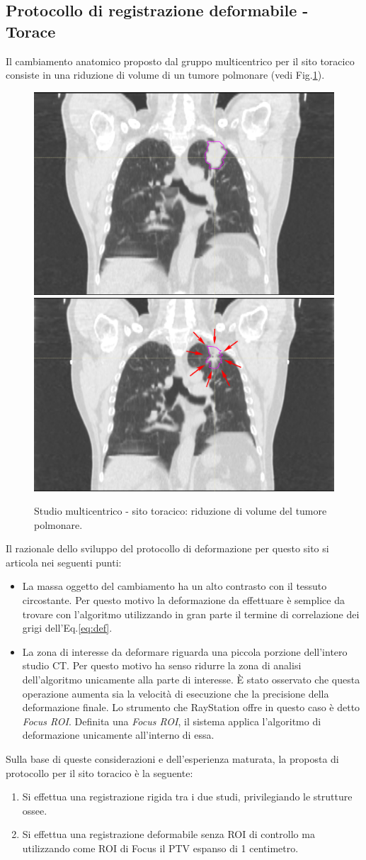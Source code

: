 \subsection{Protocollo di registrazione deformabile - Torace}
Il cambiamento anatomico proposto dal gruppo multicentrico per il sito toracico consiste in una riduzione di volume di un tumore polmonare (vedi Fig.\ref{fig:YES_thorax}). 
\begin{figure}
\centering
\includegraphics[width=.48\textwidth]{./cap3/YES_Thorax.png}
\includegraphics[width=.48\textwidth]{./cap3/YES_Thorax_shrink.png}
\caption{Studio multicentrico - sito toracico: riduzione di volume del tumore polmonare.}
\label{fig:YES_thorax}
\end{figure}
Il razionale dello sviluppo del protocollo di deformazione per questo sito si articola nei seguenti punti:
\begin{itemize}
\item La massa oggetto del cambiamento ha un alto contrasto con il tessuto circostante. Per questo motivo la deformazione da effettuare è semplice da trovare con l'algoritmo utilizzando in gran parte il termine di correlazione dei grigi dell'Eq.\eqref{eq:def}.
\item La zona di interesse da deformare riguarda una piccola porzione dell'intero studio CT. Per questo motivo ha senso ridurre la zona di analisi dell'algoritmo unicamente alla parte di interesse. \`E stato osservato che questa operazione aumenta sia la velocità di esecuzione che la precisione della deformazione finale. Lo strumento che RayStation offre in questo caso è detto \textit{Focus ROI}. Definita una \textit{Focus ROI}, il sistema applica l'algoritmo di deformazione unicamente all'interno di essa. 
\end{itemize}
Sulla base di queste considerazioni e dell'esperienza maturata, la proposta di protocollo per il sito toracico è la seguente:
\begin{enumerate}
\item Si effettua una registrazione rigida tra i due studi, privilegiando le strutture ossee.
\item Si effettua una registrazione deformabile senza ROI di controllo ma utilizzando come ROI di Focus il PTV espanso di 1 centimetro.
\end{enumerate}


